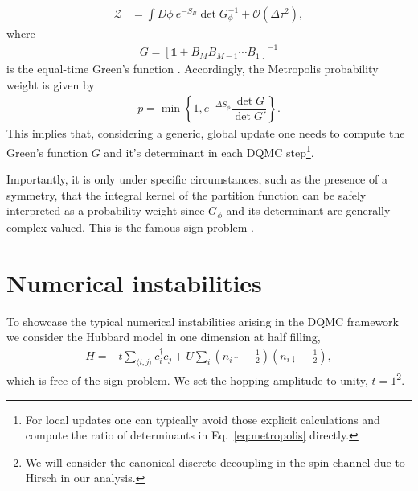\documentclass[submission, Phys]{SciPost}
\begin{document}
%
\begin{align}
	\mathcal{Z} &= \int D\phi \ e^{-S_B} \det{G_\phi^{-1}} + \mathcal{O}\left(\Delta\tau^2\right), \label{eq:DQMC}
\end{align}
%
where
\begin{align}
	G = \left[ \mathbb{1} + B_M B_{M-1} \cdots B_1 \right]^{-1} \label{etgf}
\end{align}
is the equal-time Green's function \cite{Sachdev2011}. Accordingly, the Metropolis probability weight is given by
\begin{align}
p = \min \left\{ 1 , e^{-\Delta S_\phi}  \dfrac{\det G}{\det G'} \right\}. \label{eq:metropolis}
\end{align}
This implies that, considering a generic, global update one needs to compute the Green's function $G$ and it's determinant in each DQMC step\footnote{For local updates one can typically avoid those explicit calculations and compute the ratio of determinants in Eq.~\eqref{eq:metropolis} directly\cite{Schattner2016}.}.

Importantly, it is only under specific circumstances, such as the presence of a symmetry, that the integral kernel of the partition function can be safely interpreted as a probability weight since $G_\phi$ and its determinant are generally complex valued. This is the famous sign problem \cite{Li2019}.

\section{Numerical instabilities}\label{sec:instabilities}

To showcase the typical numerical instabilities arising in the DQMC framework we consider the Hubbard model in one dimension at half filling,
\begin{align}
	H = -t\sum_{\langle i,j \rangle} c_i^\dagger c_j + U \sum_i \left( n_{i\uparrow} - \frac{1}{2} \right) \left( n_{i\downarrow} - \frac{1}{2} \right) \label{eq:model},
\end{align}
which is free of the sign-problem\cite{Li2019}. We set the hopping amplitude to unity, $t=1$\footnote{We will consider the canonical discrete decoupling \cite{Hirsch1983} in the spin channel due to Hirsch in our analysis.}.
\end{document}
